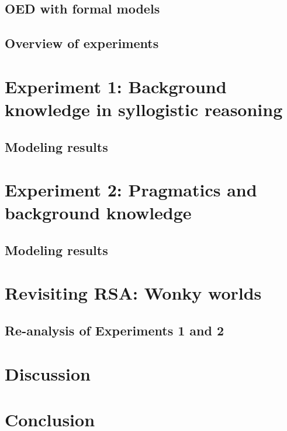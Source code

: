 \documentclass{llncs} %
\begin{document}
\subsection{OED with formal models}

\subsection{Overview of experiments} 

\section{Experiment 1: Background knowledge in syllogistic reasoning}

\subsection{Modeling results}

\section{Experiment 2: Pragmatics and background knowledge}

\subsection{Modeling results}

\section{Revisiting RSA: Wonky worlds}

\subsection{Re-analysis of Experiments 1 and 2}

\section{Discussion}

\section{Conclusion}




\end{document}
